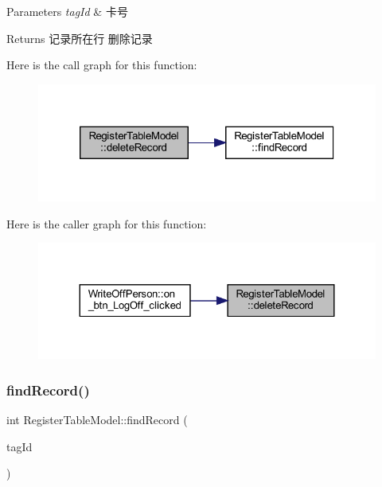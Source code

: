 \begin{DoxyParams}{Parameters}
{\em tag\+Id} & 卡号 \\
\hline
\end{DoxyParams}
\begin{DoxyReturn}{Returns}
记录所在行 删除记录 
\end{DoxyReturn}
Here is the call graph for this function\+:
\nopagebreak
\begin{figure}[H]
\begin{center}
\leavevmode
\includegraphics[width=320pt]{class_register_table_model_a5bc3bbf6efa90e52e7759ddf89e8d6bb_cgraph}
\end{center}
\end{figure}
Here is the caller graph for this function\+:
\nopagebreak
\begin{figure}[H]
\begin{center}
\leavevmode
\includegraphics[width=324pt]{class_register_table_model_a5bc3bbf6efa90e52e7759ddf89e8d6bb_icgraph}
\end{center}
\end{figure}
\mbox{\label{class_register_table_model_a5d54272261bd8aaae74929fa468b0271}} 
\subsubsection{\texorpdfstring{findRecord()}{findRecord()}}
{\footnotesize\ttfamily int Register\+Table\+Model\+::find\+Record (\begin{DoxyParamCaption}\item[{Q\+String \&}]{tag\+Id }\end{DoxyParamCaption})}



